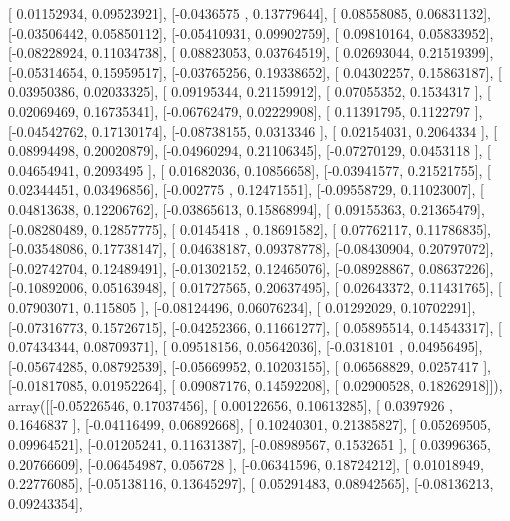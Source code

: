 \documentclass{article}
\begin{document}
       [ 0.01152934,  0.09523921],
       [-0.0436575 ,  0.13779644],
       [ 0.08558085,  0.06831132],
       [-0.03506442,  0.05850112],
       [-0.05410931,  0.09902759],
       [ 0.09810164,  0.05833952],
       [-0.08228924,  0.11034738],
       [ 0.08823053,  0.03764519],
       [ 0.02693044,  0.21519399],
       [-0.05314654,  0.15959517],
       [-0.03765256,  0.19338652],
       [ 0.04302257,  0.15863187],
       [ 0.03950386,  0.02033325],
       [ 0.09195344,  0.21159912],
       [ 0.07055352,  0.1534317 ],
       [ 0.02069469,  0.16735341],
       [-0.06762479,  0.02229908],
       [ 0.11391795,  0.1122797 ],
       [-0.04542762,  0.17130174],
       [-0.08738155,  0.0313346 ],
       [ 0.02154031,  0.2064334 ],
       [ 0.08994498,  0.20020879],
       [-0.04960294,  0.21106345],
       [-0.07270129,  0.0453118 ],
       [ 0.04654941,  0.2093495 ],
       [ 0.01682036,  0.10856658],
       [-0.03941577,  0.21521755],
       [ 0.02344451,  0.03496856],
       [-0.002775  ,  0.12471551],
       [-0.09558729,  0.11023007],
       [ 0.04813638,  0.12206762],
       [-0.03865613,  0.15868994],
       [ 0.09155363,  0.21365479],
       [-0.08280489,  0.12857775],
       [ 0.0145418 ,  0.18691582],
       [ 0.07762117,  0.11786835],
       [-0.03548086,  0.17738147],
       [ 0.04638187,  0.09378778],
       [-0.08430904,  0.20797072],
       [-0.02742704,  0.12489491],
       [-0.01302152,  0.12465076],
       [-0.08928867,  0.08637226],
       [-0.10892006,  0.05163948],
       [ 0.01727565,  0.20637495],
       [ 0.02643372,  0.11431765],
       [ 0.07903071,  0.115805  ],
       [-0.08124496,  0.06076234],
       [ 0.01292029,  0.10702291],
       [-0.07316773,  0.15726715],
       [-0.04252366,  0.11661277],
       [ 0.05895514,  0.14543317],
       [ 0.07434344,  0.08709371],
       [ 0.09518156,  0.05642036],
       [-0.0318101 ,  0.04956495],
       [-0.05674285,  0.08792539],
       [-0.05669952,  0.10203155],
       [ 0.06568829,  0.0257417 ],
       [-0.01817085,  0.01952264],
       [ 0.09087176,  0.14592208],
       [ 0.02900528,  0.18262918]]), array([[-0.05226546,  0.17037456],
       [ 0.00122656,  0.10613285],
       [ 0.0397926 ,  0.1646837 ],
       [-0.04116499,  0.06892668],
       [ 0.10240301,  0.21385827],
       [ 0.05269505,  0.09964521],
       [-0.01205241,  0.11631387],
       [-0.08989567,  0.1532651 ],
       [ 0.03996365,  0.20766609],
       [-0.06454987,  0.056728  ],
       [-0.06341596,  0.18724212],
       [ 0.01018949,  0.22776085],
       [-0.05138116,  0.13645297],
       [ 0.05291483,  0.08942565],
       [-0.08136213,  0.09243354],
\end{document}
